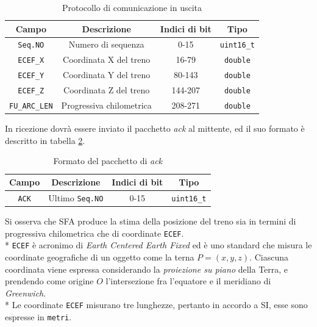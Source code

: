 \begin{table}[h]
	\centering
	\begin{tabular}{|c|c|c|c|}
		\hline 
		\textbf{Campo} & \textbf{Descrizione} & \textbf{Indici di bit} & \textbf{Tipo} \\ 
		\hline
		\texttt{Seq.NO} & Numero di sequenza & 0-15 & \texttt{uint16\_t} \\ 
		\hline 
		\texttt{ECEF\_X} & Coordinata X del treno & 16-79 & \texttt{double} \\ 
		\hline 
		\texttt{ECEF\_Y} & Coordinata Y del treno & 80-143 & \texttt{double} \\ 
		\hline 
		\texttt{ECEF\_Z} & Coordinata Z del treno & 144-207 & \texttt{double} \\ 
		\hline 
		\texttt{FU\_ARC\_LEN} & Progressiva chilometrica & 208-271 & \texttt{double} \\ 
		\hline 
	\end{tabular} 
\caption{Protocollo di comunicazione in uscita}
\label{tab:protoout}
\end{table}
In ricezione dovr\`a essere inviato il pacchetto \emph{ack} al mittente, ed il suo formato \`e descritto in tabella \ref{tab:ack}.
\begin{table}[h]
	\centering
	\begin{tabular}{|c|c|c|c|}
	\hline 
	\textbf{Campo} & \textbf{Descrizione} & \textbf{Indici di bit} & \textbf{Tipo} \\ 
	\hline
	\texttt{ACK} & Ultimo \texttt{Seq.NO} & 0-15 & \texttt{uint16\_t} \\ 
	\hline
\end{tabular}
\caption{Formato del pacchetto di \emph{ack}}
\label{tab:ack}
\end{table}
Si osserva che SFA produce la stima della posizione del treno sia in termini di progressiva chilometrica che di coordinate \texttt{ECEF}.\\*
\texttt{ECEF} \`e acronimo di \emph{Earth Centered Earth Fixed} ed \`e uno standard che misura le coordinate geografiche di un oggetto come la terna $ P = (x,y,z)$. Ciascuna coordinata viene espressa considerando la \emph{proiezione su piano} della Terra, e prendendo come origine $O$ l'intersezione fra l'equatore e il meridiano di \emph{Greenwich}.\\*
Le coordinate \texttt{ECEF} misurano tre lunghezze, pertanto in accordo a SI, esse sono espresse in \texttt{metri}.
